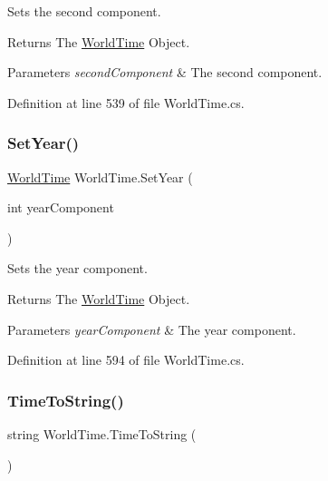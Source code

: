 Sets the second component. 

\begin{DoxyReturn}{Returns}
The \hyperlink{struct_world_time}{World\+Time} Object.
\end{DoxyReturn}

\begin{DoxyParams}{Parameters}
{\em second\+Component} & The second component.\\
\hline
\end{DoxyParams}


Definition at line 539 of file World\+Time.\+cs.

\mbox{\label{struct_world_time_a89f889e3bdaa5915039fb39dd78c211c}} 
\subsubsection{\texorpdfstring{Set\+Year()}{SetYear()}}
{\footnotesize\ttfamily \hyperlink{struct_world_time}{World\+Time} World\+Time.\+Set\+Year (\begin{DoxyParamCaption}\item[{int}]{year\+Component }\end{DoxyParamCaption})}



Sets the year component. 

\begin{DoxyReturn}{Returns}
The \hyperlink{struct_world_time}{World\+Time} Object.
\end{DoxyReturn}

\begin{DoxyParams}{Parameters}
{\em year\+Component} & The year component.\\
\hline
\end{DoxyParams}


Definition at line 594 of file World\+Time.\+cs.

\mbox{\label{struct_world_time_aa2faf2c350acee94faf8a8e88c586ea0}} 
\subsubsection{\texorpdfstring{Time\+To\+String()}{TimeToString()}}
{\footnotesize\ttfamily string World\+Time.\+Time\+To\+String (\begin{DoxyParamCaption}{ }\end{DoxyParamCaption})}



